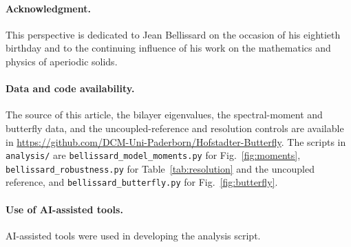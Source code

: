 \documentclass[11pt,a4paper]{article}
\begin{document}
\paragraph{Acknowledgment.}
This perspective is dedicated to Jean Bellissard on the occasion of his eightieth birthday and to the continuing influence of his work on the mathematics and physics of aperiodic solids.

\paragraph{Data and code availability.}
The source of this article, the bilayer eigenvalues, the spectral-moment and butterfly data, and the uncoupled-reference and resolution controls are available in \url{https://github.com/DCM-Uni-Paderborn/Hofstadter-Butterfly}. The scripts in \texttt{analysis/} are \texttt{bellissard\_model\_moments.py} for Fig.~\ref{fig:moments}, \texttt{bellissard\_robustness.py} for Table~\ref{tab:resolution} and the uncoupled reference, and \texttt{bellissard\_butterfly.py} for Fig.~\ref{fig:butterfly}.

\paragraph{Use of AI-assisted tools.}
AI-assisted tools were used in developing the analysis script.



\end{document}
